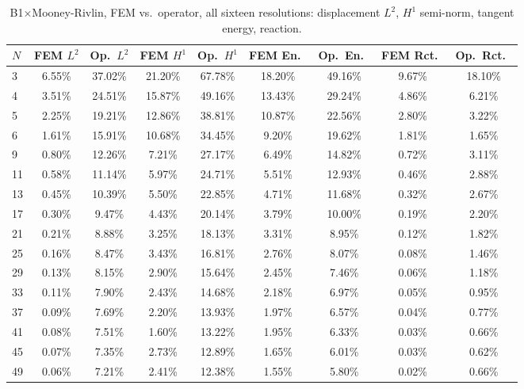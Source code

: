 \documentclass[final,5p,times]{elsarticle}
\begin{document}
\begin{table}[ht]
\centering
\caption{B1$\times$Mooney-Rivlin, FEM vs.\ operator, all sixteen
  resolutions: displacement $L^2$, $H^1$ semi-norm, tangent energy,
  reaction.}
\label{tab:b1-b1mr-a}
\scriptsize
\begin{tabular}{lcccccccc}
\toprule
$N$ & FEM $L^2$ & Op.\ $L^2$ & FEM $H^1$ & Op.\ $H^1$ & FEM En.\ & Op.\ En.\ & FEM Rct.\ & Op.\ Rct.\ \\
\midrule
3  & 6.55\% & 37.02\% & 21.20\% & 67.78\% & 18.20\% & 49.16\% & 9.67\% & 18.10\% \\
4  & 3.51\% & 24.51\% & 15.87\% & 49.16\% & 13.43\% & 29.24\% & 4.86\% & 6.21\%  \\
5  & 2.25\% & 19.21\% & 12.86\% & 38.81\% & 10.87\% & 22.56\% & 2.80\% & 3.22\%  \\
6  & 1.61\% & 15.91\% & 10.68\% & 34.45\% & 9.20\%  & 19.62\% & 1.81\% & 1.65\%  \\
9  & 0.80\% & 12.26\% & 7.21\%  & 27.17\% & 6.49\%  & 14.82\% & 0.72\% & 3.11\%  \\
11 & 0.58\% & 11.14\% & 5.97\%  & 24.71\% & 5.51\%  & 12.93\% & 0.46\% & 2.88\%  \\
13 & 0.45\% & 10.39\% & 5.50\%  & 22.85\% & 4.71\%  & 11.68\% & 0.32\% & 2.67\%  \\
17 & 0.30\% & 9.47\%  & 4.43\%  & 20.14\% & 3.79\%  & 10.00\% & 0.19\% & 2.20\%  \\
21 & 0.21\% & 8.88\%  & 3.25\%  & 18.13\% & 3.31\%  & 8.95\%  & 0.12\% & 1.82\%  \\
25 & 0.16\% & 8.47\%  & 3.43\%  & 16.81\% & 2.76\%  & 8.07\%  & 0.08\% & 1.46\%  \\
29 & 0.13\% & 8.15\%  & 2.90\%  & 15.64\% & 2.45\%  & 7.46\%  & 0.06\% & 1.18\%  \\
33 & 0.11\% & 7.90\%  & 2.43\%  & 14.68\% & 2.18\%  & 6.97\%  & 0.05\% & 0.95\%  \\
37 & 0.09\% & 7.69\%  & 2.20\%  & 13.93\% & 1.97\%  & 6.57\%  & 0.04\% & 0.77\%  \\
41 & 0.08\% & 7.51\%  & 1.60\%  & 13.22\% & 1.95\%  & 6.33\%  & 0.03\% & 0.66\%  \\
45 & 0.07\% & 7.35\%  & 2.73\%  & 12.89\% & 1.65\%  & 6.01\%  & 0.03\% & 0.62\%  \\
49 & 0.06\% & 7.21\%  & 2.41\%  & 12.38\% & 1.55\%  & 5.80\%  & 0.02\% & 0.66\%  \\
\bottomrule
\end{tabular}
\end{table}
\end{document}

